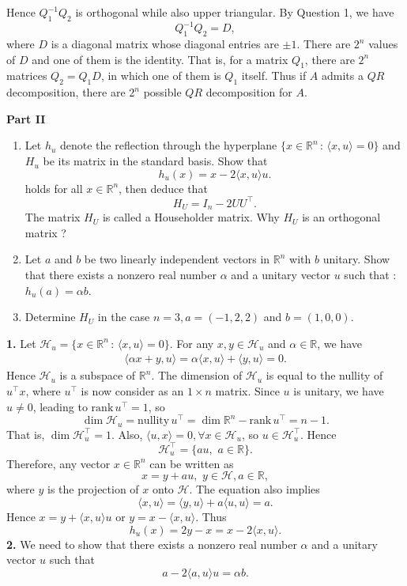 Hence $Q_1^{-1}Q_2$ is orthogonal while also upper triangular. By Question 1, we have $$Q_1^{-1}Q_2=D,$$
where $D$ is a diagonal matrix whose diagonal entries are $\pm 1$. There are $2^n$ values of $D$ and one of them is the identity. That is, for a matrix $Q_1$, there are $2^n$ matrices $Q_2=Q_1D$, in which one of them is $Q_1$ itself. Thus if $A$ admits a $QR$ decomposition, there are $2^n$ possible $QR$ decomposition for $A$.

\begin{center}
    \textbf{Part II}
\end{center}

\begin{enumerate}
    \item Let $h_u$ denote the reflection through the hyperplane $\{x\in\mathbb{R}^n\,:\, \langle x,u\rangle = 0\}$ and $H_u$ be its matrix in the standard basis. Show that
    $$h_u(x)=x-2\langle x,u\rangle u.$$
    holds for all $x\in\mathbb{R}^n$, then deduce that
    $$H_U=I_n-2UU^\top.$$
    The matrix $H_U$ is called a Householder matrix. Why $H_U$ is an orthogonal matrix ?
    \item  Let $a$ and $b$ be two linearly independent vectors in $\mathbb{R}^n$ with $b$ unitary. Show that there exists a nonzero real number $\alpha$ and a unitary vector $u$ such that : $h_u(a) = \alpha b$.
    \item Determine $H_U$ in the case $n = 3, a = (-1, 2, 2)$ and $b = (1, 0, 0)$.
\end{enumerate}

\textbf{1.} Let $\mathcal{H}_u=\{x\in\mathbb{R}^n\,:\, \langle x,u\rangle = 0\}$. For any $x,y\in\mathcal{H}_u$ and $\alpha\in\mathbb{R}$, we have
\begin{align*}
    \langle \alpha x+y, u\rangle = \alpha\langle x, u\rangle + \langle y, u\rangle = 0.
\end{align*}
Hence $\mathcal{H}_u$ is a subspace of $\mathbb{R}^n$. The dimension of $\mathcal{H}_u$ is equal to the nullity of $u^\top x$, where $u^\top$ is now consider as an $1\times n$ matrix. Since  $u$ is unitary, we have $u\ne 0$, leading to $\mathrm{rank}\,u^\top=1$, so 
$$\dim\mathcal{H}_u=\mathrm{nullity}\,u^\top = \dim\mathbb{R}^n - \mathrm{rank}\,u^\top = n - 1.$$
That is, $\dim\mathcal{H}^\top_u=1$.  Also, $\langle u,x\rangle =0,\forall x\in\mathcal{H}_u$, so $u\in\mathcal{H}^\top_u$. Hence 
$$\mathcal{H}^\top_u=\{au,\,\,a\in\mathbb{R}\}.$$
Therefore, any vector $x\in\mathbb{R}^n$ can be written as
$$x=y+au,\,\,y\in\mathcal{H},a\in\mathbb{R},$$
where $y$ is the projection of $x$ onto $\mathcal{H}$. The equation also implies
$$\langle x,u\rangle = \langle y,u\rangle + a\langle u,u\rangle = a.$$
Hence $x=y+\langle x,u\rangle u$ or $y= x - \langle x,u\rangle$.
Thus $$h_u(x)=2y-x=x-2\langle x,u\rangle.$$
\textbf{2. } We need to show that there exists a nonzero real number $\alpha$ and a unitary vector $u$ such that
$$a-2\langle a,u\rangle u = \alpha b.$$

